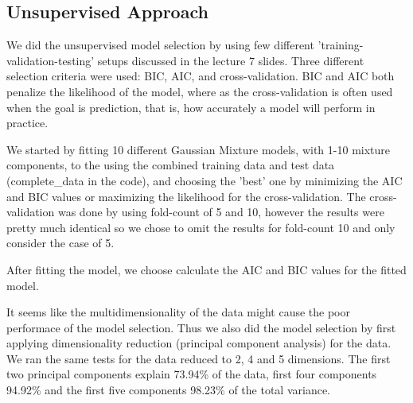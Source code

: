 \subsection{Unsupervised Approach}
We did the unsupervised model selection by using few different 'training-validation-testing' setups discussed in the lecture 7 slides. Three different selection criteria were used: BIC, AIC, and cross-validation. BIC and AIC both penalize the likelihood of the model, where as the cross-validation is often used when the goal is prediction, that is, how accurately a model will perform in practice.

We started by fitting 10 different Gaussian Mixture models, with 1-10 mixture components, to the using the combined training data and test data (complete\_data in the code), and choosing the 'best' one by minimizing the AIC and BIC values or maximizing the likelihood for the cross-validation. The cross-validation was done by using fold-count of 5 and 10, however the results were pretty much identical so we chose to omit the results for fold-count 10 and only consider the case of 5.

After fitting the model, we choose calculate the AIC and BIC values for the fitted model.

It seems like the multidimensionality of the data might cause the poor performace of the model selection. Thus we also did the model selection by first applying dimensionality reduction (principal component analysis) for the data. We ran the same tests for the data reduced to 2, 4 and 5 dimensions. The first two principal components explain 73.94\% of the data, first four components 94.92\% and the first five components 98.23\% of the total variance.



